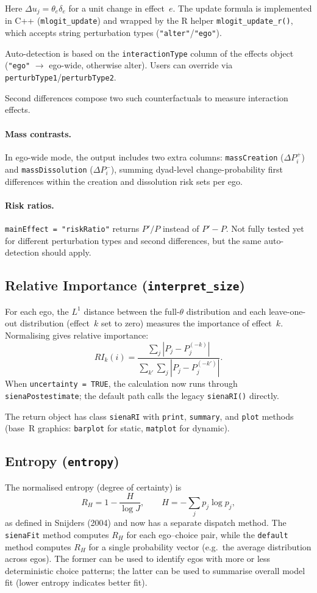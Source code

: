 \documentclass[11pt,a4paper]{article}
\begin{document}
Here $\Delta u_j = \theta_e \delta_e$ for a unit change in effect~$e$.
The update formula is implemented in C++ (\texttt{mlogit\_update}) and
wrapped by the R helper \texttt{mlogit\_update\_r()}, which accepts
string perturbation types (\texttt{"alter"}/\texttt{"ego"}).

Auto-detection is based on the \texttt{interactionType} column of the
effects object (\texttt{"ego"} $\to$ ego-wide, otherwise alter).  Users
can override via \texttt{perturbType1}/\texttt{perturbType2}.

Second differences compose two such counterfactuals to measure
interaction effects.

\paragraph{Mass contrasts.}
In ego-wide mode, the output includes two extra columns:
\texttt{massCreation} ($\Delta P_i^+$) and \texttt{massDissolution}
($\Delta P_i^-$), summing dyad-level change-probability first differences
within the creation and dissolution risk sets per ego.

\paragraph{Risk ratios.}
\texttt{mainEffect = "riskRatio"} returns $P'/P$ instead of $P'-P$. Not fully 
tested yet for different perturbation types and second differences, but 
the same auto-detection should apply.

\subsection{Relative Importance (\texttt{interpret\_size})}
For each ego, the $L^1$ distance between the full-$\theta$ distribution
and each leave-one-out distribution (effect~$k$ set to zero) measures
the importance of effect~$k$.  Normalising gives relative importance:
\[
  RI_k(i) = \frac{\sum_j |P_j - P_j^{(-k)}|}
                  {\sum_{k'} \sum_j |P_j - P_j^{(-k')}|}.
\]
When \texttt{uncertainty = TRUE}, the calculation now runs through
\texttt{sienaPostestimate}; the default path calls the legacy
\texttt{sienaRI()} directly.

The return object has class \texttt{sienaRI} with \texttt{print},
\texttt{summary}, and \texttt{plot} methods (base~R graphics:
\texttt{barplot} for static, \texttt{matplot} for dynamic).

\subsection{Entropy (\texttt{entropy})}
The normalised entropy (degree of certainty) is
\[
  R_H = 1 - \frac{H}{\log J}, \qquad
  H = -\sum_j p_j \log p_j,
\]
as defined in Snijders (2004) and now has a separate dispatch method. 
The \texttt{sienaFit} method computes $R_H$ for each ego--choice pair, 
while the \texttt{default} method computes $R_H$ for a single probability
vector (e.g.\ the average distribution across egos).  The former can be used to 
identify egos with more or less deterministic choice patterns; the latter can be used to summarise overall model fit (lower entropy indicates better fit).
\end{document}
